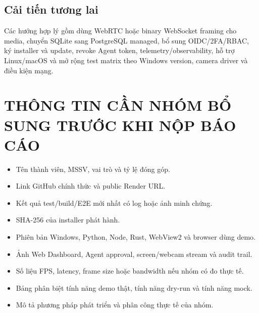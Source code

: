 \documentclass[12pt,a4paper]{article}
\begin{document}
\subsection{Cải tiến tương lai}

Các hướng hợp lý gồm dùng WebRTC hoặc binary WebSocket framing cho media, chuyển SQLite sang PostgreSQL managed, bổ sung OIDC/2FA/RBAC, ký installer và update, revoke Agent token, telemetry/observability, hỗ trợ Linux/macOS và mở rộng test matrix theo Windows version, camera driver và điều kiện mạng.

\section{THÔNG TIN CẦN NHÓM BỔ SUNG TRƯỚC KHI NỘP BÁO CÁO}

\begin{itemize}[leftmargin=*]
    \item Tên thành viên, MSSV, vai trò và tỷ lệ đóng góp.
    \item Link GitHub chính thức và public Render URL.
    \item Kết quả test/build/E2E mới nhất có log hoặc ảnh minh chứng.
    \item SHA-256 của installer phát hành.
    \item Phiên bản Windows, Python, Node, Rust, WebView2 và browser dùng demo.
    \item Ảnh Web Dashboard, Agent approval, screen/webcam stream và audit trail.
    \item Số liệu FPS, latency, frame size hoặc bandwidth nếu nhóm có đo thực tế.
    \item Bảng phân biệt tính năng demo thật, tính năng dry-run và tính năng mock.
    \item Mô tả phương pháp phát triển và phân công thực tế của nhóm.
\end{itemize}
\end{document}
